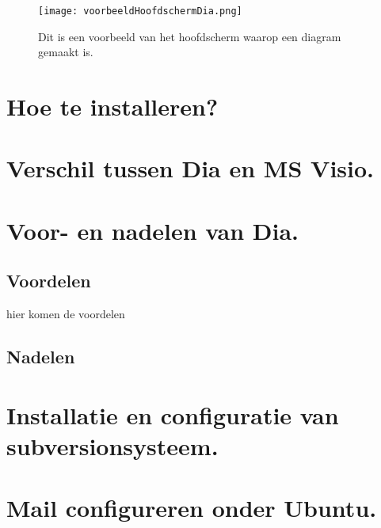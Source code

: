 \documentclass[11pt]{article}
\begin{document}
\begin{figure}[hb]
\centering
\texttt{[image: voorbeeldHoofdschermDia.png]}  
\caption [Hoofd Scherm]{Dit is een voorbeeld van het hoofdscherm waarop een diagram gemaakt is.}
\end{figure}   

\section {Hoe te installeren?}

\section {Verschil tussen Dia en MS Visio.}

\section {Voor- en nadelen van Dia.}
\subsection{Voordelen}
hier komen de voordelen
\subsection{Nadelen}

\section{Installatie en configuratie van subversionsysteem.}

\section{Mail configureren onder Ubuntu.}
\end{document}
